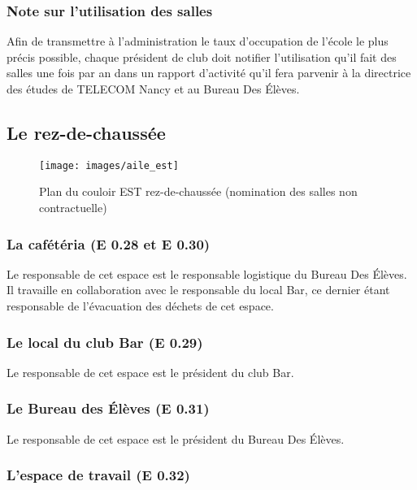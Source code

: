 \documentclass{article} %
\begin{document}
			\subsubsection{Note sur l’utilisation des salles}

				Afin de transmettre à l’administration le taux d’occupation de
				l’école le plus précis possible, chaque président de club doit
				notifier l’utilisation qu’il fait des salles une fois par an
				dans un rapport d'activité qu'il fera parvenir à la directrice
				des études de TELECOM Nancy et au Bureau Des Élèves.

		\subsection{Le rez-de-chaussée}
		
		\begin{figure}[]
			\centering
			\texttt{[image: images/aile\_est]}
			\caption{Plan du couloir EST rez-de-chaussée (nomination des salles
			non contractuelle)}
			\label{fig:plan}
		\end{figure}

			\subsubsection{La cafétéria (E 0.28 et E 0.30)}

				Le responsable de cet espace est le responsable logistique du
				Bureau Des Élèves. Il travaille en collaboration avec le
				responsable du local Bar, ce dernier étant responsable de
				l’évacuation des déchets de cet espace.

			\subsubsection{Le local du club Bar (E 0.29)}

				Le responsable de cet espace est le président du club Bar.

			\subsubsection{Le Bureau des Élèves (E 0.31)}

				Le responsable de cet espace est le président du Bureau Des
				Élèves.

			\subsubsection{L’espace de travail (E 0.32)}
\end{document}
